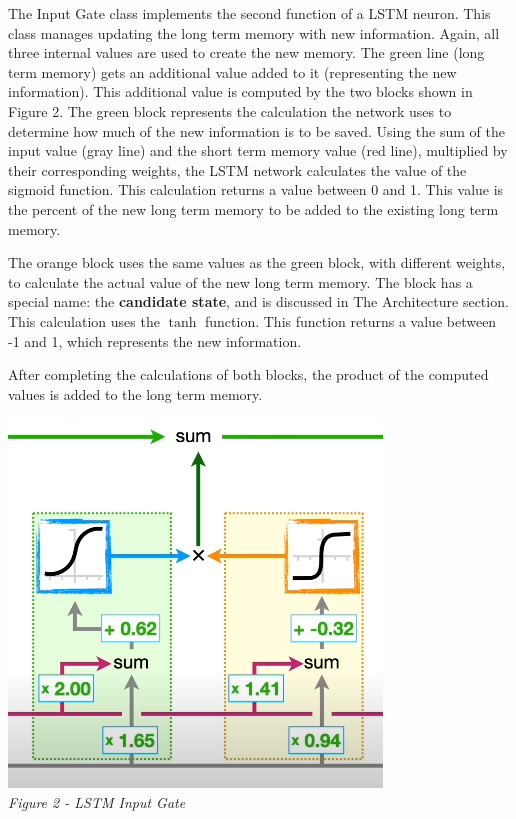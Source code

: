 \documentclass[12pt]{article}
\begin{document}
The Input Gate class implements the second function of a LSTM neuron. This
class manages updating the long term memory with new information. Again, all
three internal values are used to create the new memory. The green line (long
term memory) gets an additional value added to it (representing the new
information). This additional value is computed by the two blocks shown in
Figure 2. The green block represents the calculation the network uses to
determine how much of the new information is to be saved. Using the sum of the
input value (gray line) and the short term memory value (red line), multiplied
by their corresponding weights, the LSTM network calculates the value of the
sigmoid function. This calculation returns a value between 0 and 1. This value
is the percent of the new long term memory to be added to the existing long
term memory.

The orange block uses the same values as the green block, with different
weights, to calculate the actual value of the new long term memory. The block
has a special name: the \textbf{candidate state}, and is discussed in The
Architecture section. This calculation uses the $\tanh$ function. This function
returns a value between -1 and 1, which represents the new information.

After completing the calculations of both blocks, the product of the computed
values is added to the long term memory.

\begin{center}
    \includegraphics{InputGate.png}\\
    \emph{Figure 2 - LSTM Input Gate}
\end{center}
\end{document}
